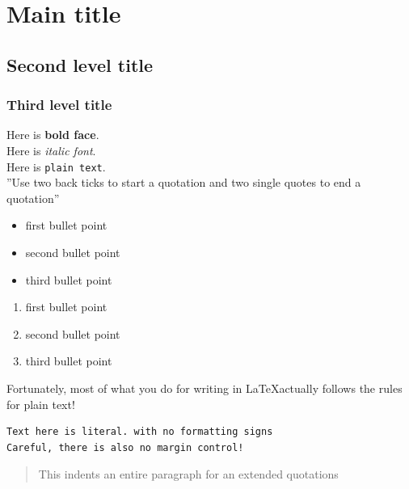 \documentclass{article}\usepackage[]{graphicx}\usepackage[]{color}
\begin{document}


\section*{Main title}

\subsection*{Second level title}

\subsubsection*{Third level title}

Here is \textbf{bold face}.\\
Here is \textit{italic font}.\\
Here is \texttt{plain text}.\\

''Use two back ticks to start a quotation and two single quotes to end a quotation''

\begin{itemize}
  \item first bullet point
  \item second bullet point
  \item third bullet point
\end{itemize}

\begin{enumerate}
  \item first bullet point
  \item second bullet point
  \item third bullet point
\end{enumerate}

Fortunately, most of what you do for writing in \LaTeX actually follows the rules for plain text!

\begin{verbatim}
Text here is literal. with no formatting signs
Careful, there is also no margin control!
\end{verbatim}

\begin{quote}
This indents an entire paragraph for an extended quotations
\end{quote}

\end{document}
